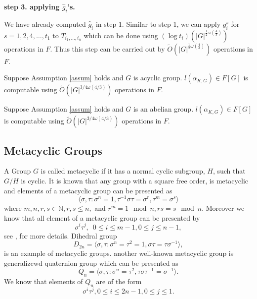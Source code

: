 \documentclass[sigconf]{acmart}
\newcommand{\osum}[2]{\alpha_{#1,#2}}
\newcommand{\thecost}{\tilde{O}(\vert G \vert ^{3/4 \omega(4/3)})}
\theoremstyle{acmplain}
\begin{document}
\textbf{step 3. applying $\hat{g}_i$'s.}

We have already computed $\hat{g}_i$ in step 1. Similar to step 1, we can apply $g_i^s$ 
for $s = 1, 2, 4 , \ldots, t_1$ to $T_{i_1, \ldots , i_n}$ which can be done using $(\log t_i)(\vert G \vert^{\frac{1}{2}\omega
(\frac{4}{3})})$ operations in $F$. Thus this step can be carried out by $\tilde{O}(\vert G \vert^{\frac{1}{2}\omega
(\frac{4}{3})})$ operations in $F$. \begin{proposition}
Suppose Assumption \ref{assum} holds and $G$ is acyclic group. $l(\osum{K}{G}) \in F[G]$ is computable using $\thecost$ 
operations in $F$.
\end{proposition}

\begin{proposition}
Suppose Assumption \ref{assum} holds and $G$ is an abelian group. $l(\osum{K}{G}) \in F[G]$ is computable using $\thecost$ 
operations in $F$.
\end{proposition}

\subsection{Metacyclic Groups}

A Group $G$ is called metacyclic if it has a normal cyclic subgroup, $H$, such that $G/H$ is cyclic. It is known that any group
with a square free order, is metacyclic and elements of a metacyclic group can be presented as 
\begin{equation}\label{eq:metacyclic}
\langle \sigma,\tau: \sigma^n = 1, \tau^{-1}\sigma \tau = \sigma^r, \tau ^m = \sigma^s \rangle
\end{equation}
where $m,n,r,s \in \mathbb{N}, r,s \leq n,$ and $r^m = 1 \mod n , rs = s \mod n$. Moreover we know that all element of a metacyclic
 group can be presented by $$\sigma^i \tau^j, \,\,\, 0\leq i \leq m-1, 0\leq j \leq n-1,$$ 
see \cite[P.88, Proposition 1]{Johnson}, \cite[P.334]{Curtis} for more details. Dihedral group 
$$D_{2n} = \langle \sigma,\tau: \sigma^n =\tau^2 = 1, \sigma \tau = \tau \sigma^{-1} \rangle, $$
is an example of metacyclic groups. another well-known metacyclic group is generalizewd quaternion
 group which can be presented as
 $$Q_n = \langle \sigma,\tau: \sigma^n =\tau^2, \tau \sigma \tau^{-1} = \sigma^{-1} \rangle.$$
 We know that elements of $Q_n$ are of the form 
 $$\sigma^i\tau^j, 0 \leq i \leq 2n-1 , 0\leq j \leq 1.$$
 
\end{document}
